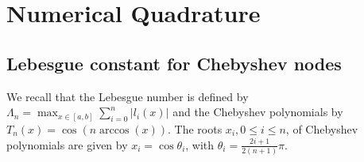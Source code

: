 \chapter{Numerical Quadrature}

\section{Lebesgue constant for Chebyshev nodes}
We recall that the Lebesgue number is defined by \(\Lambda_n=\max_{x\in[a,b]}\sum_{i=0}^{n}|l_i(x)|\) and the Chebyshev polynomials by \(T_n(x)=\cos(n\arccos(x))\).
The roots \(x_i,0\leq i\leq n\), of Chebyshev polynomials are given by \(x_i=\cos\theta_i\), with \(\theta_i=\frac{2i+1}{2(n+1)}\pi\).
